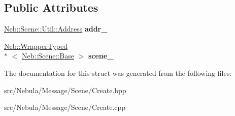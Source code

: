 \subsection*{Public Attributes}
\begin{DoxyCompactItemize}
\item 
\hypertarget{structNeb_1_1Message_1_1Scene_1_1Create_a153eb033fce14632f7ba8259bc754bd9}{\hyperlink{classNeb_1_1Scene_1_1Util_1_1Address}{Neb\-::\-Scene\-::\-Util\-::\-Address} {\bfseries addr\-\_\-}}\label{structNeb_1_1Message_1_1Scene_1_1Create_a153eb033fce14632f7ba8259bc754bd9}

\item 
\hypertarget{structNeb_1_1Message_1_1Scene_1_1Create_a49efd907dbc1a014114113a2b5288598}{\hyperlink{classNeb_1_1WrapperTyped}{Neb\-::\-Wrapper\-Typed}\\*
$<$ \hyperlink{classNeb_1_1Scene_1_1Base}{Neb\-::\-Scene\-::\-Base} $>$ {\bfseries scene\-\_\-}}\label{structNeb_1_1Message_1_1Scene_1_1Create_a49efd907dbc1a014114113a2b5288598}

\end{DoxyCompactItemize}


The documentation for this struct was generated from the following files\-:\begin{DoxyCompactItemize}
\item 
src/\-Nebula/\-Message/\-Scene/Create.\-hpp\item 
src/\-Nebula/\-Message/\-Scene/Create.\-cpp\end{DoxyCompactItemize}
